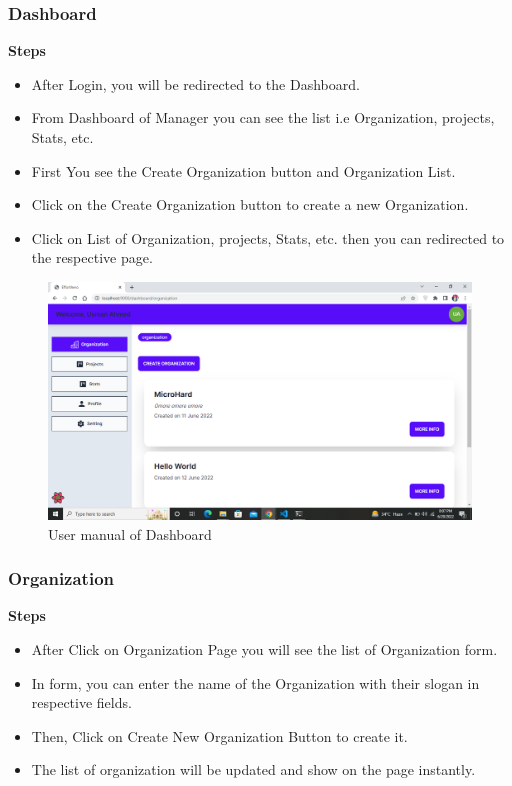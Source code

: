 \subsubsection{Dashboard}
\textbf{Steps}
\begin{itemize}
    \item After Login, you will be redirected to the Dashboard.
    \item From Dashboard of Manager you can see the list i.e Organization, projects, Stats, etc.
    \item First You see the Create Organization button and Organization List.
    \item Click on the Create Organization button to create a new Organization.
    \item Click on List of Organization, projects, Stats, etc. then you can redirected to the respective page.
\end{itemize}
\begin{figure}[H]
    \centering
    \includegraphics[scale=0.4]{./diagrams/user-manual/Screenshot (18).png}
    \caption{User manual of Dashboard}
    \label{fig:user-1}

\end{figure}

\subsubsection{Organization}
\textbf{Steps}
\begin{itemize}
    \item After Click on Organization Page you will see the list of Organization form.
    \item In form, you can enter the name of the Organization with their slogan in respective fields.
    \item Then, Click on Create New Organization Button to create it.
    \item The list of organization will be updated and show on the page instantly.
\end{itemize}

